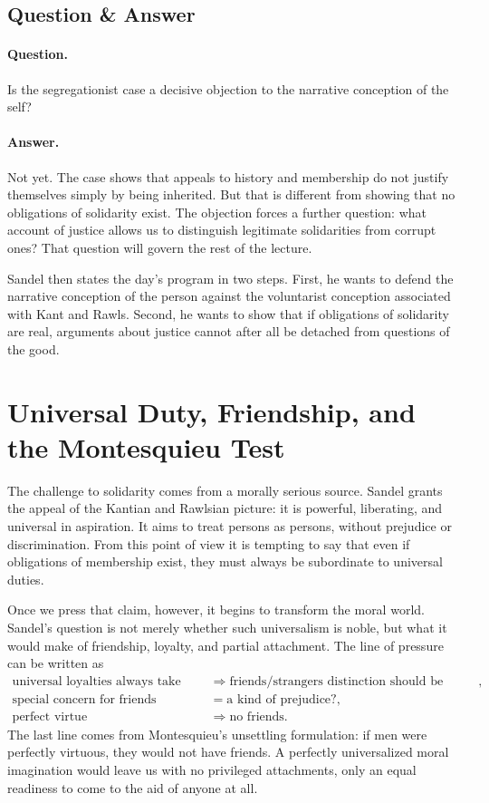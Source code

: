 \subsection{Question \& Answer}

\paragraph{Question.} Is the segregationist case a decisive objection to the narrative conception of the self?

\paragraph{Answer.} Not yet. The case shows that appeals to history and membership do not justify themselves simply by being inherited. But that is different from showing that no obligations of solidarity exist. The objection forces a further question: what account of justice allows us to distinguish legitimate solidarities from corrupt ones? That question will govern the rest of the lecture.

Sandel then states the day's program in two steps. First, he wants to defend the narrative conception of the person against the voluntarist conception associated with Kant and Rawls. Second, he wants to show that if obligations of solidarity are real, arguments about justice cannot after all be detached from questions of the good.

\section{Universal Duty, Friendship, and the Montesquieu Test}

The challenge to solidarity comes from a morally serious source. Sandel grants the appeal of the Kantian and Rawlsian picture: it is powerful, liberating, and universal in aspiration. It aims to treat persons as persons, without prejudice or discrimination. From this point of view it is tempting to say that even if obligations of membership exist, they must always be subordinate to universal duties.

Once we press that claim, however, it begins to transform the moral world. Sandel's question is not merely whether such universalism is noble, but what it would make of friendship, loyalty, and partial attachment. The line of pressure can be written as
\begin{align}
\text{universal loyalties always take precedence}
&\Longrightarrow
\text{friends/strangers distinction should be overcome},\\
\text{special concern for friends}
&=
\text{a kind of prejudice?},\\
\text{perfect virtue}
&\Longrightarrow
\text{no friends}.
\end{align}
The last line comes from Montesquieu's unsettling formulation: if men were perfectly virtuous, they would not have friends. A perfectly universalized moral imagination would leave us with no privileged attachments, only an equal readiness to come to the aid of anyone at all.

